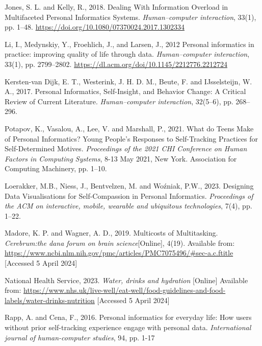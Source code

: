 \documentclass[11pt]{article}
\begin{document}
\renewcommand{\refname}{} 
\vspace{-20pt}
\begin{thebibliography}{99}
    Jones, S. L. and Kelly, R., 2018. 
    Dealing With Information Overload in Multifaceted Personal Informatics Systems. 
    \textit{Human–computer interaction}, 33(1), pp. 1–48. \url{https://doi.org/10.1080/07370024.2017.1302334}

    Li, I., Medynskiy, Y., Froehlich, J., and Larsen, J., 2012 
    Personal informatics in practice: 
     improving quality of life through data.
    \textit{Human–computer interaction}, 33(1),  pp. 2799–2802. \url{https://dl.acm.org/doi/10.1145/2212776.2212724}

    Kersten-van Dijk, E. T., Westerink, J. H. D. M., Beute, F. and 
    IJsselsteijn, W. A., 2017. 
    Personal Informatics, Self-Insight, and Behavior Change: A Critical Review of Current Literature. 
    \textit{Human–computer interaction}, 32(5–6), pp. 268–296.

    Potapov, K., Vasalou, A., Lee, V. and Marshall, P., 2021. 
    What do Teens Make of Personal Informatics? 
    Young People's Responses to Self-Tracking Practices for Self-Determined Motives. 
    \textit{Proceedings of the 2021 CHI Conference on Human Factors in Computing Systems}, 
    8-13 May 2021, New York. Association for Computing Machinery, pp. 1–10.

    Loerakker, M.B., Niess, J., Bentvelzen, M. and Woźniak, P.W., 2023. 
    Designing Data Visualisations for Self-Compassion in Personal Informatics. 
    \textit{Proceedings of the ACM on interactive, mobile, wearable and ubiquitous technologies}, 7(4), pp. 1–22.

    Madore, K. P. and Wagner, A. D., 2019. Multicosts of Multitasking. 
    \textit{Cerebrum:the dana forum on brain science}[Online], 4(19). Available from:
    \url{https://www.ncbi.nlm.nih.gov/pmc/articles/PMC7075496/#sec-a.c.ftitle} 
    [Accessed 5 April 2024]

    National Health Service, 2023. \textit{Water, drinks and hydration} [Online] 
    Available from: 
    \url{https://www.nhs.uk/live-well/eat-well/food-guidelines-and-food-labels/water-drinks-nutrition} 
    [Accessed 5 April 2024]
    
    Rapp, A. and Cena, F., 2016. Personal informatics for everyday life: 
    How users without prior self-tracking experience engage with personal data. 
    \textit{International journal of human-computer studies}, 94, pp. 1-17


\end{thebibliography}
\end{document}

